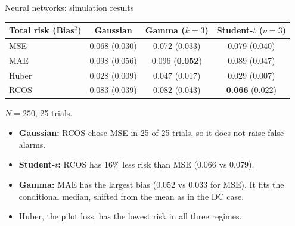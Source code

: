 \documentclass[aspectratio=169, 11pt]{beamer}
\begin{document}
\begin{frame}{Neural networks: simulation results}
  \small
  \begin{center}
  \begin{tabular}{lccc}
    \toprule
    Total risk (Bias$^2$) & Gaussian & Gamma ($k = 3$) & Student-$t$ ($\nu = 3$) \\
    \midrule
    MSE   & 0.068 (0.030) & 0.072 (0.033) & 0.079 (0.040) \\
    MAE   & 0.098 (0.056) & 0.096 (\textbf{0.052}) & 0.089 (0.047) \\
    Huber & 0.028 (0.009) & 0.047 (0.017) & 0.029 (0.007) \\
    RCOS  & 0.083 (0.039) & 0.082 (0.043) & \textbf{0.066} (0.022) \\
    \bottomrule
  \end{tabular}
  \end{center}
  $N = 250$, 25 trials.
  \begin{itemize}
    \item \textbf{Gaussian:} RCOS chose MSE in 25 of 25 trials, so it does not raise false alarms.
    \item \textbf{Student-$t$:} RCOS has $16\%$ less risk than MSE ($0.066$ vs $0.079$).
    \item \textbf{Gamma:} MAE has the largest bias ($0.052$ vs $0.033$ for MSE). It fits the conditional median, shifted from the mean as in the DC case.
    \item Huber, the pilot loss, has the lowest risk in all three regimes.
  \end{itemize}
\end{frame}
\end{document}
